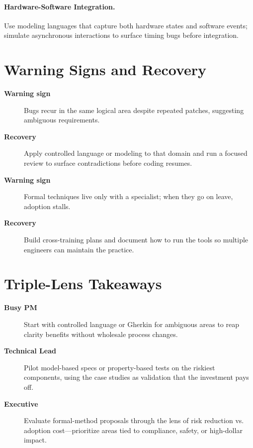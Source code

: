 \paragraph{Hardware-Software Integration.} Use modeling languages that capture both hardware states and software events; simulate asynchronous interactions to surface timing bugs before integration.
\section{Warning Signs and Recovery}
\label{sec:formal-warning}
\begin{description}
    \item[\textbf{Warning sign}] Bugs recur in the same logical area despite repeated patches, suggesting ambiguous requirements.
    \item[\textbf{Recovery}] Apply controlled language or modeling to that domain and run a focused review to surface contradictions before coding resumes.
    \item[\textbf{Warning sign}] Formal techniques live only with a specialist; when they go on leave, adoption stalls.
    \item[\textbf{Recovery}] Build cross-training plans and document how to run the tools so multiple engineers can maintain the practice.
\end{description}

\section{Triple-Lens Takeaways}
\label{sec:formal-triple}

\begin{description}
    \item[\textbf{Busy PM}] Start with controlled language or Gherkin for ambiguous areas to reap clarity benefits without wholesale process changes.
    \item[\textbf{Technical Lead}] Pilot model-based specs or property-based tests on the riskiest components, using the case studies as validation that the investment pays off.
    \item[\textbf{Executive}] Evaluate formal-method proposals through the lens of risk reduction vs. adoption cost—prioritize areas tied to compliance, safety, or high-dollar impact.
\end{description}
